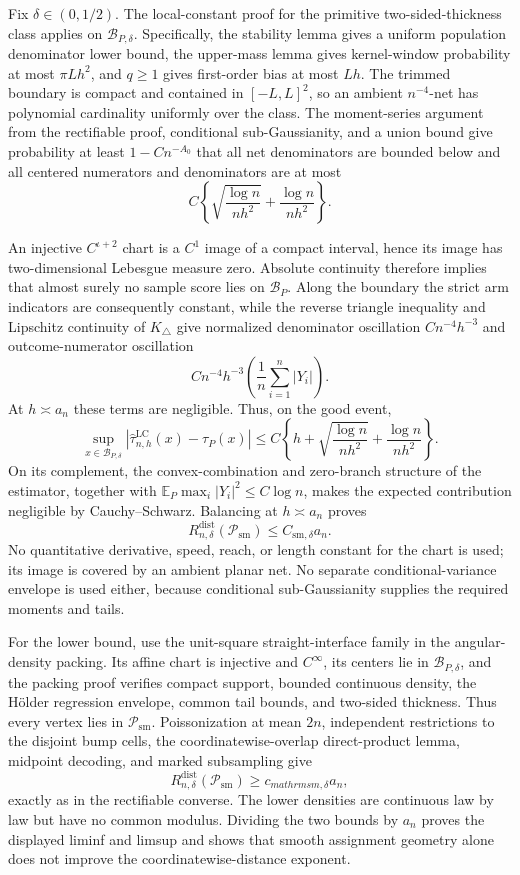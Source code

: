 Fix \(\delta\in(0,1/2)\).  The local-constant proof for the primitive two-sided-thickness class applies on \(\mathcal B_{P,\delta}\).  Specifically, the stability lemma gives a uniform population denominator lower bound, the upper-mass lemma gives kernel-window probability at most \(\pi Lh^2\), and \(q\geq1\) gives first-order bias at most \(Lh\).  The trimmed boundary is compact and contained in \([-L,L]^2\), so an ambient \(n^{-4}\)-net has polynomial cardinality uniformly over the class.  The moment-series argument from the rectifiable proof, conditional sub-Gaussianity, and a union bound give probability at least \(1-Cn^{-A_0}\) that all net denominators are bounded below and all centered numerators and denominators are at most
\[
 C\left\{\sqrt{\frac{\log n}{nh^2}}+\frac{\log n}{nh^2}\right\}.
\]

An injective \(C^{\iota+2}\) chart is a \(C^1\) image of a compact interval, hence its image has two-dimensional Lebesgue measure zero.  Absolute continuity therefore implies that almost surely no sample score lies on \(\mathcal B_P\).  Along the boundary the strict arm indicators are consequently constant, while the reverse triangle inequality and Lipschitz continuity of \(K_\triangle\) give normalized denominator oscillation \(C n^{-4}h^{-3}\) and outcome-numerator oscillation
\[
 Cn^{-4}h^{-3}\left(\frac1n\sum_{i=1}^n|Y_i|\right).
\]
At \(h\asymp a_n\) these terms are negligible.  Thus, on the good event,
\[
 \sup_{x\in\mathcal B_{P,\delta}}
 |\widehat\tau^{\mathrm{LC}}_{n,h}(x)-\tau_P(x)|
 \leq C\left\{h+\sqrt{\frac{\log n}{nh^2}}+\frac{\log n}{nh^2}\right\}.
\]
On its complement, the convex-combination and zero-branch structure of the estimator, together with
\(\mathbb E_P\max_i|Y_i|^2\leq C\log n\), makes the expected contribution negligible by Cauchy--Schwarz.  Balancing at \(h\asymp a_n\) proves
\[
 R_{n,\delta}^{\mathrm{dist}}(\mathcal P_{\mathrm{sm}})
 \leq C_{\mathrm{sm},\delta}a_n.
\]
No quantitative derivative, speed, reach, or length constant for the chart is used; its image is covered by an ambient planar net.  No separate conditional-variance envelope is used either, because conditional sub-Gaussianity supplies the required moments and tails.

For the lower bound, use the unit-square straight-interface family in the angular-density packing.  Its affine chart is injective and \(C^\infty\), its centers lie in \(\mathcal B_{P,\delta}\), and the packing proof verifies compact support, bounded continuous density, the H\"older regression envelope, common tail bounds, and two-sided thickness.  Thus every vertex lies in \(\mathcal P_{\mathrm{sm}}\).  Poissonization at mean \(2n\), independent restrictions to the disjoint bump cells, the coordinatewise-overlap direct-product lemma, midpoint decoding, and marked subsampling give
\[
 R_{n,\delta}^{\mathrm{dist}}(\mathcal P_{\mathrm{sm}})
 \geq c_{mathrm{sm},\delta}a_n,
\]
exactly as in the rectifiable converse.  The lower densities are continuous law by law but have no common modulus.  Dividing the two bounds by \(a_n\) proves the displayed liminf and limsup and shows that smooth assignment geometry alone does not improve the coordinatewise-distance exponent.